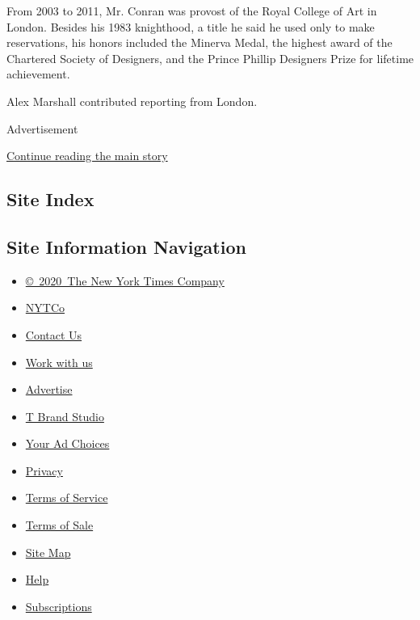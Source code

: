 From 2003 to 2011, Mr. Conran was provost of the Royal College of Art in
London. Besides his 1983 knighthood, a title he said he used only to
make reservations, his honors included the Minerva Medal, the highest
award of the Chartered Society of Designers, and the Prince Phillip
Designers Prize for lifetime achievement.

Alex Marshall contributed reporting from London.

Advertisement

\protect\hyperlink{after-bottom}{Continue reading the main story}

\hypertarget{site-index}{%
\subsection{Site Index}\label{site-index}}

\hypertarget{site-information-navigation}{%
\subsection{Site Information
Navigation}\label{site-information-navigation}}

\begin{itemize}
\tightlist
\item
  \href{https://help.nytimes3xbfgragh.onion/hc/en-us/articles/115014792127-Copyright-notice}{©~2020~The
  New York Times Company}
\end{itemize}

\begin{itemize}
\tightlist
\item
  \href{https://www.nytco.com/}{NYTCo}
\item
  \href{https://help.nytimes3xbfgragh.onion/hc/en-us/articles/115015385887-Contact-Us}{Contact
  Us}
\item
  \href{https://www.nytco.com/careers/}{Work with us}
\item
  \href{https://nytmediakit.com/}{Advertise}
\item
  \href{http://www.tbrandstudio.com/}{T Brand Studio}
\item
  \href{https://www.nytimes3xbfgragh.onion/privacy/cookie-policy\#how-do-i-manage-trackers}{Your
  Ad Choices}
\item
  \href{https://www.nytimes3xbfgragh.onion/privacy}{Privacy}
\item
  \href{https://help.nytimes3xbfgragh.onion/hc/en-us/articles/115014893428-Terms-of-service}{Terms
  of Service}
\item
  \href{https://help.nytimes3xbfgragh.onion/hc/en-us/articles/115014893968-Terms-of-sale}{Terms
  of Sale}
\item
  \href{https://spiderbites.nytimes3xbfgragh.onion}{Site Map}
\item
  \href{https://help.nytimes3xbfgragh.onion/hc/en-us}{Help}
\item
  \href{https://www.nytimes3xbfgragh.onion/subscription?campaignId=37WXW}{Subscriptions}
\end{itemize}
